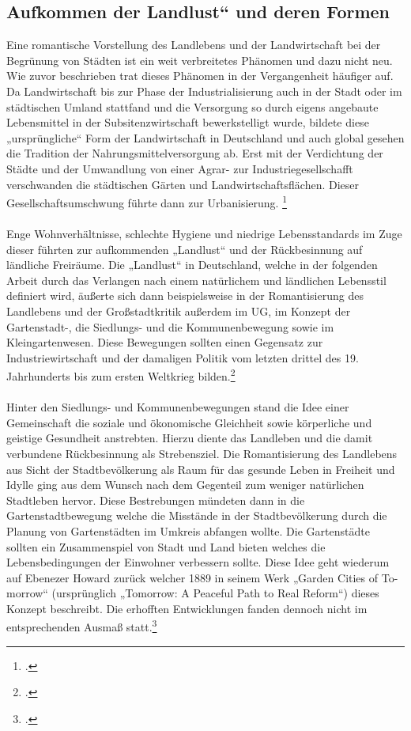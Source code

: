\documentclass{scrartcl}
\begin{document}
\subsection{Aufkommen der Landlust“ und deren Formen}
Eine romantische Vorstellung des Landlebens und der Landwirtschaft bei der Begrünung von Städten ist ein weit verbreitetes Phänomen und dazu nicht neu. Wie zuvor beschrieben trat dieses Phänomen in der Vergangenheit häufiger auf. Da Landwirtschaft bis zur Phase der Industrialisierung auch in der Stadt oder im städtischen Umland stattfand und die Versorgung so durch eigens angebaute Lebensmittel in der Subsitenzwirtschaft bewerkstelligt wurde, bildete diese „ursprüngliche“ Form der Landwirtschaft in Deutschland und auch global gesehen die Tradition der Nahrungsmittelversorgung ab. Erst mit der Verdichtung der Städte und der Umwandlung von einer Agrar- zur Industriegesellschafft verschwanden die städtischen Gärten und Landwirtschaftsflächen. Dieser Gesellschaftsumschwung führte dann zur Urbanisierung. \footcite[Vgl.][S. 32ff]{Egnolff2015DieIdeal}\\
\\
Enge Wohnverhältnisse, schlechte Hygiene und niedrige Lebensstandards im Zuge dieser führten zur aufkommenden „Landlust“ und der Rückbesinnung auf ländliche Freiräume. Die „Landlust“ in Deutschland, welche in der folgenden Arbeit durch das Verlangen nach einem natürlichem und ländlichen Lebensstil definiert wird, äußerte sich dann beispielsweise in der Romantisierung des Landlebens und der Großstadtkritik außerdem im UG, im Konzept der Gartenstadt-, die Siedlungs- und die Kommunenbewegung sowie im Kleingartenwesen. Diese Bewegungen sollten einen Gegensatz zur Industriewirtschaft und der damaligen Politik vom letzten drittel des 19. Jahrhunderts bis zum ersten Weltkrieg bilden.\footcite[Vgl.][S. 35]{Egnolff2015DieIdeal}\\
\\
Hinter den Siedlungs- und Kommunenbewegungen stand die Idee einer Gemeinschaft die soziale und ökonomische Gleichheit sowie körperliche und geistige Gesundheit anstrebten. Hierzu diente das Landleben und die damit verbundene Rückbesinnung als Strebensziel. Die Romantisierung des Landlebens aus Sicht der Stadtbevölkerung als Raum für das gesunde Leben in Freiheit und Idylle ging aus dem Wunsch nach dem Gegenteil zum weniger natürlichen Stadtleben hervor. Diese Bestrebungen mündeten dann in die Gartenstadtbewegung welche die Misstände in der Stadtbevölkerung durch die Planung von Gartenstädten im Umkreis abfangen wollte. Die Gartenstädte sollten ein Zusammenspiel von Stadt und Land bieten welches die Lebensbedingungen der Einwohner verbessern sollte. Diese Idee geht wiederum auf Ebenezer Howard zurück welcher 1889 in seinem Werk „Garden Cities of To-morrow“ (ursprünglich „Tomorrow: A Peaceful Path to Real Reform“) dieses Konzept beschreibt. Die erhofften Entwicklungen fanden dennoch nicht im entsprechenden Ausmaß statt.\footcite[Vgl.][S. 36]{Egnolff2015DieIdeal}
\end{document}
